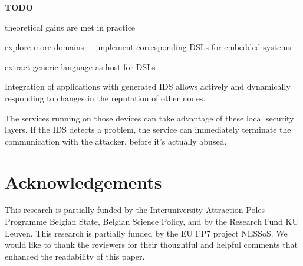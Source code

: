\documentclass[conference]{IEEEtran}
\newcommand{\TODO}{\textbf{\color{red}TODO}}
\begin{document}
\TODO

theoretical gains are met in practice

explore more domains + implement corresponding DSLs for embedded systems

extract generic language as host for DSLs

Integration of applications with generated IDS allows actively and dynamically
responding to changes in the reputation of other nodes.

The services running on those devices can take advantage of these local
security layers. If the IDS detects a problem, the service can immediately
terminate the communication with the attacker, before it's actually abused.

\section*{Acknowledgements}

This research is partially funded by the Interuniversity Attraction Poles
Programme Belgian State, Belgian Science Policy, and by the Research Fund KU
Leuven. This research is partially funded by the EU FP7 project NESSoS. We
would like to thank the reviewers for their thoughtful and helpful comments
that enhanced the readability of this paper.



\end{document}
